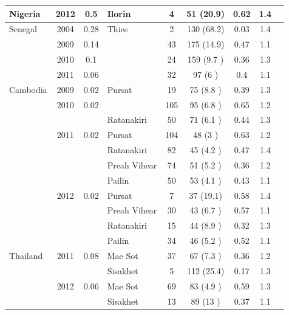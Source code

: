 \documentclass[9pt,lineno]{elife}
\begin{document}
\begin{table}[btp]
{\begin{tabular}{p{1.4cm} c c |p{1.7cm} c c c c p{2.7cm}}
\cline{1-8}
Nigeria         &2012           &0.5   &Ilorin&4    &51   (20.9)&0.62 &1.4  &\\
\hline
Senegal         &2004           &0.28  &Thies&2    &130  (68.2)&0.03 &1.4  &\citet{Wong2017}\\
                &2009           &0.14  &               &43   &175  (14.9)&0.47 &1.1  &\\
                &2010           &0.1   &               &24   &159  (9.7 )&0.36 &1.3  &\\
                &2011           &0.06  &               &32   &97   (6   )&0.4  &1.1  &\\
\hline
\hline
Cambodia        &2009           &0.02  &Pursat&19   &75   (8.8 )&0.39 &1.3  &\multirow{3}{*}{\parbox{3.4cm}{\citet{Amato2017, eLife2016}}}\\
                &2010           &0.02  &               &105  &95   (6.8 )&0.65 &1.2  &\\
                &               &      &Ratanakiri&50   &71   (6.1 )&0.44 &1.3  &\\
                &2011           &0.02  &Pursat&104  &48   (3   )&0.63 &1.2  &\\
                &               &      &Ratanakiri&82   &45   (4.2 )&0.47 &1.4  &\\
                &               &      &Preah Vihear&74   &51   (5.2 )&0.36 &1.2  &\\
                &               &      &Pailin&50   &53   (4.1 )&0.43 &1.1  &\\
                &2012           &0.02  &Pursat&7    &37   (19.1)&0.58 &1.4  &\\
                &               &      &Preah Vihear&30   &43   (6.7 )&0.57 &1.1  &\\
                &               &      &Ratanakiri&15   &44   (8.9 )&0.32 &1.3  &\\
                &               &      &Pailin&34   &46   (5.2 )&0.52 &1.1  &\\
\hline
Thailand        &2011           &0.08  &Mae Sot&37   &67   (7.3 )&0.36 &1.2  &\multirow{3}{*}{\parbox{3.4cm}{\citet{Miotto2013, eLife2016}}}\\
                &               &      &Sisakhet&5    &112  (25.4)&0.17 &1.3  &\\
                &2012           &0.06  &Mae Sot&69   &83   (4.9 )&0.59 &1.3  &\\
                &               &      &Sisakhet&13   &89   (13  )&0.37 &1.1  &\\

\end{tabular}}
\end{table}
\end{document}

